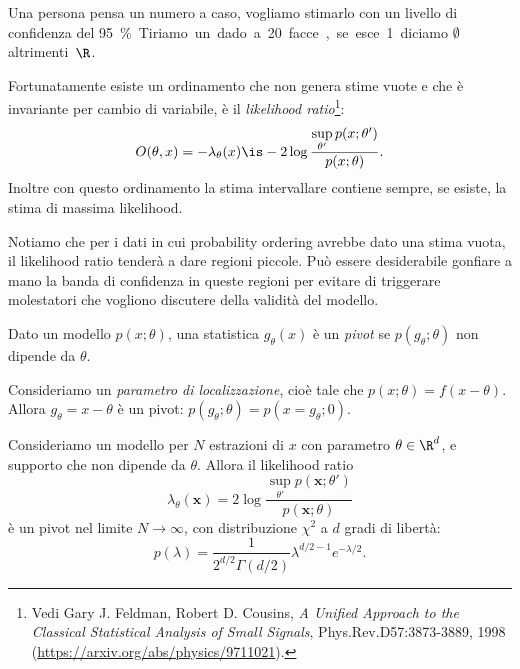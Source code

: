 \begin{example}
	Una persona pensa un numero a caso,
	vogliamo stimarlo con un livello di confidenza del \SI{95}\%.
	Tiriamo un dado a 20 facce,
	se esce 1 diciamo $\emptyset$ altrimenti~$\R$.
\end{example}

Fortunatamente esiste un ordinamento che non genera stime vuote e che è invariante per cambio di variabile,
è il \emph{likelihood ratio}\footnote{Vedi Gary J. Feldman, Robert D. Cousins, \emph{A Unified Approach to the Classical Statistical Analysis of Small Signals},  Phys.Rev.D57:3873-3889, 1998 (\url{https://arxiv.org/abs/physics/9711021}).}:
\begin{equation*}
	O(\theta,x) = -\lambda_\theta(x)
	\is -2\log\frac {\sup\limits_{\theta'} p(x;\theta')} {p(x;\theta)}.
\end{equation*}
Inoltre con questo ordinamento la stima intervallare contiene sempre,
se esiste,
la stima di massima likelihood.

Notiamo che per i dati in cui probability ordering avrebbe dato una stima vuota,
il likelihood ratio tenderà a dare regioni piccole.
Può essere desiderabile gonfiare a mano la banda di confidenza in queste regioni
per evitare di triggerare molestatori che vogliono discutere della validità del modello.

\begin{definition}[Pivot]
	Dato un modello $p(x;\theta)$,
	una statistica $g_\theta(x)$ è un \emph{pivot}
	se $p(g_\theta;\theta)$ non dipende da $\theta$.
\end{definition}

\begin{example}
	Consideriamo un \emph{parametro di localizzazione},
	cioè tale che $p(x;\theta)=f(x-\theta)$.
	Allora $g_\theta=x-\theta$ è un pivot:
	$p(g_\theta;\theta) = p(x=g_\theta;0)$.
\end{example}

\begin{fact}
	\label{th:wilks}
	Consideriamo un modello per $N$ estrazioni di $x$ con parametro $\theta\in\R^d$,
	e supporto che non dipende da $\theta$.
	Allora il likelihood ratio
	\begin{equation*}
		\lambda_\theta(\mathbf x)
		= 2\log\frac {\sup\limits_{\theta'} p(\mathbf x;\theta')} {p(\mathbf x;\theta)}
	\end{equation*}
	è un pivot nel limite $N\to\infty$,
	con distribuzione $\chi^2$ a $d$ gradi di libertà:
	\begin{equation*}
		p(\lambda)
		= \frac1{2^{d/2}\Gamma(d/2)} \lambda^{d/2-1} e^{-\lambda/2}.
	\end{equation*}
\end{fact}

